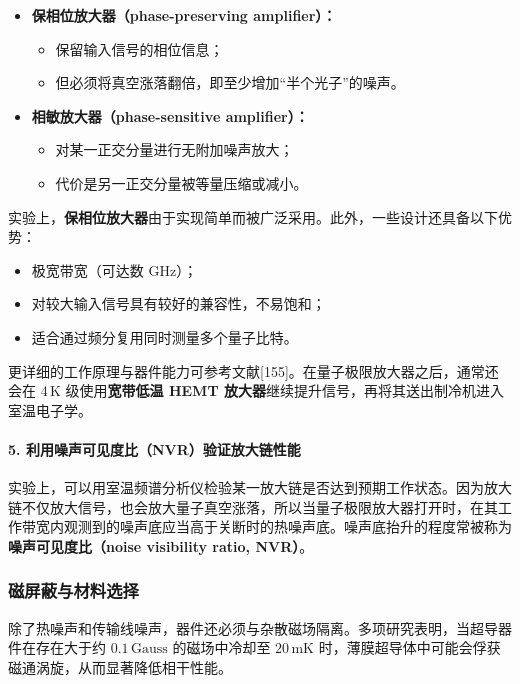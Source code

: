 \documentclass[12pt,a4paper,oneside]{ctexbook}
\begin{document}
\begin{itemize}
    \item \textbf{保相位放大器（phase-preserving amplifier）：}
    \begin{itemize}
        \item 保留输入信号的相位信息；
        \item 但必须将真空涨落翻倍，即至少增加“半个光子”的噪声。
    \end{itemize}
    \item \textbf{相敏放大器（phase-sensitive amplifier）：}
    \begin{itemize}
        \item 对某一正交分量进行无附加噪声放大；
        \item 代价是另一正交分量被等量压缩或减小。
    \end{itemize}
\end{itemize}

实验上，\textbf{保相位放大器}由于实现简单而被广泛采用。此外，一些设计还具备以下优势：

\begin{itemize}
    \item 极宽带宽（可达数 GHz）；
    \item 对较大输入信号具有较好的兼容性，不易饱和；
    \item 适合通过频分复用同时测量多个量子比特。
\end{itemize}

更详细的工作原理与器件能力可参考文献[155]。在量子极限放大器之后，通常还会在 $4\,\mathrm{K}$ 级使用\textbf{宽带低温 HEMT 放大器}继续提升信号，再将其送出制冷机进入室温电子学。

\paragraph{5. 利用噪声可见度比（NVR）验证放大链性能}

实验上，可以用室温频谱分析仪检验某一放大链是否达到预期工作状态。因为放大链不仅放大信号，也会放大量子真空涨落，所以当量子极限放大器打开时，在其工作带宽内观测到的噪声底应当高于关断时的热噪声底。噪声底抬升的程度常被称为\textbf{噪声可见度比（noise visibility ratio, NVR）}。

\subsubsection{磁屏蔽与材料选择}

除了热噪声和传输线噪声，器件还必须与杂散磁场隔离。多项研究表明，当超导器件在存在大于约 $0.1\,\mathrm{Gauss}$ 的磁场中冷却至 $20\,\mathrm{mK}$ 时，薄膜超导体中可能会俘获磁通涡旋，从而显著降低相干性能。
\end{document}
